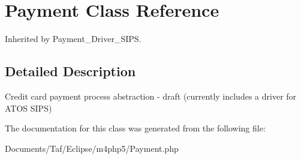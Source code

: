 \hypertarget{classPayment}{
\section{Payment Class Reference}
\label{classPayment}
}
Inherited by Payment\_\-Driver\_\-SIPS.



\subsection{Detailed Description}
Credit card payment process abstraction - draft (currently includes a driver for ATOS SIPS) 

The documentation for this class was generated from the following file:\begin{CompactItemize}
\item 
Documents/Taf/Eclipse/m4php5/Payment.php\end{CompactItemize}

